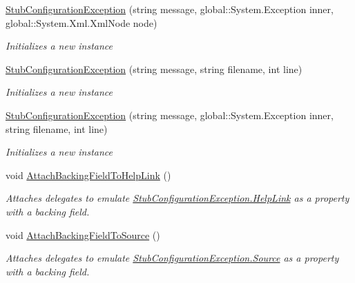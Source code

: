 \begin{DoxyCompactItemize}
\hyperlink{class_system_1_1_configuration_1_1_fakes_1_1_stub_configuration_exception_a983a2a71e76f0c9920ca1d9972038dba}{Stub\-Configuration\-Exception} (string message, global\-::\-System.\-Exception inner, global\-::\-System.\-Xml.\-Xml\-Node node)
\begin{DoxyCompactList}\small\item\em Initializes a new instance\end{DoxyCompactList}\item 
\hyperlink{class_system_1_1_configuration_1_1_fakes_1_1_stub_configuration_exception_a9697ba63f06ee5c44d47b5b5e7ed57d5}{Stub\-Configuration\-Exception} (string message, string filename, int line)
\begin{DoxyCompactList}\small\item\em Initializes a new instance\end{DoxyCompactList}\item 
\hyperlink{class_system_1_1_configuration_1_1_fakes_1_1_stub_configuration_exception_a00a85cf2f7fd27d01b076eb0d7f046a9}{Stub\-Configuration\-Exception} (string message, global\-::\-System.\-Exception inner, string filename, int line)
\begin{DoxyCompactList}\small\item\em Initializes a new instance\end{DoxyCompactList}\item 
void \hyperlink{class_system_1_1_configuration_1_1_fakes_1_1_stub_configuration_exception_ab090a7577cf1322891b8af5c3176adae}{Attach\-Backing\-Field\-To\-Help\-Link} ()
\begin{DoxyCompactList}\small\item\em Attaches delegates to emulate \hyperlink{class_system_1_1_configuration_1_1_fakes_1_1_stub_configuration_exception_aeef6d4e4ab6a425adaf6e3ca99a6f416}{Stub\-Configuration\-Exception.\-Help\-Link} as a property with a backing field.\end{DoxyCompactList}\item 
void \hyperlink{class_system_1_1_configuration_1_1_fakes_1_1_stub_configuration_exception_aa1d64f235ffaa691fe3d3f1eb9c249d2}{Attach\-Backing\-Field\-To\-Source} ()
\begin{DoxyCompactList}\small\item\em Attaches delegates to emulate \hyperlink{class_system_1_1_configuration_1_1_fakes_1_1_stub_configuration_exception_aca3d15e4fdd72086ae3084501c579fff}{Stub\-Configuration\-Exception.\-Source} as a property with a backing field.\end{DoxyCompactList}\item 

\end{DoxyCompactItemize}
